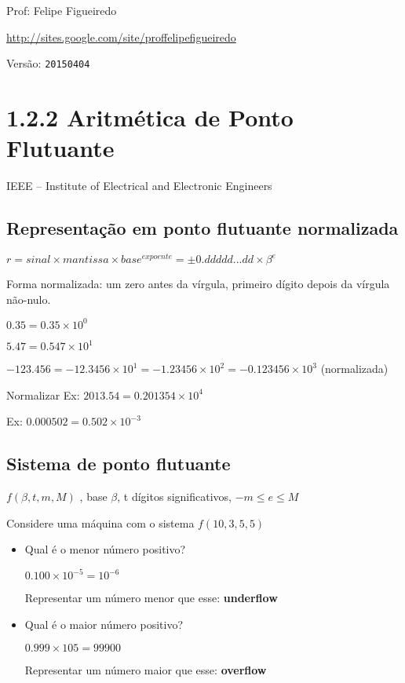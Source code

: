 \documentclass[a4paper]{article}
\begin{document}
\parbox[c]{.825\textwidth}{\raggedright%
{Prof: Felipe Figueiredo\par}
{\url{http://sites.google.com/site/proffelipefigueiredo}\par}
}

Versão: \verb|20150404|




\section*{1.2.2 Aritmética de Ponto Flutuante}
IEEE – Institute of Electrical and Electronic Engineers

\subsection*{Representação em ponto flutuante normalizada}
$r = sinal \times mantissa \times base^{expoente} = \pm 0.ddddd...dd \times \beta ^ e$

Forma normalizada: um zero antes da vírgula, primeiro dígito depois da vírgula não-nulo.

$0.35 = 0.35\times 10^0$

$5.47 = 0.547\times 10^1$

$-123.456 = -12.3456\times 10^1 = -1.23456\times 10^2 = -0.123456\times 10^3$ (normalizada)

Normalizar
Ex: $2013.54 = 0.201354\times 10^4$

Ex: $0.000502 = 0.502\times 10^{-3}$

\subsection*{Sistema de ponto flutuante}
$f(\beta, t, m, M)$ , base $\beta$, t dígitos significativos, $-m \le e \le M$

Considere uma máquina com o sistema $f(10,3,5,5)$
 
\begin{itemize}
\item Qual é o menor número positivo?
 
$0.100\times 10^{-5} = 10^{-6}$

Representar um número menor que esse: {\bf underflow}
 
\item Qual é o maior número positivo?

$0.999\times 105  =99900$

Representar um número maior que esse: {\bf overflow}
\end{itemize}
\end{document}
